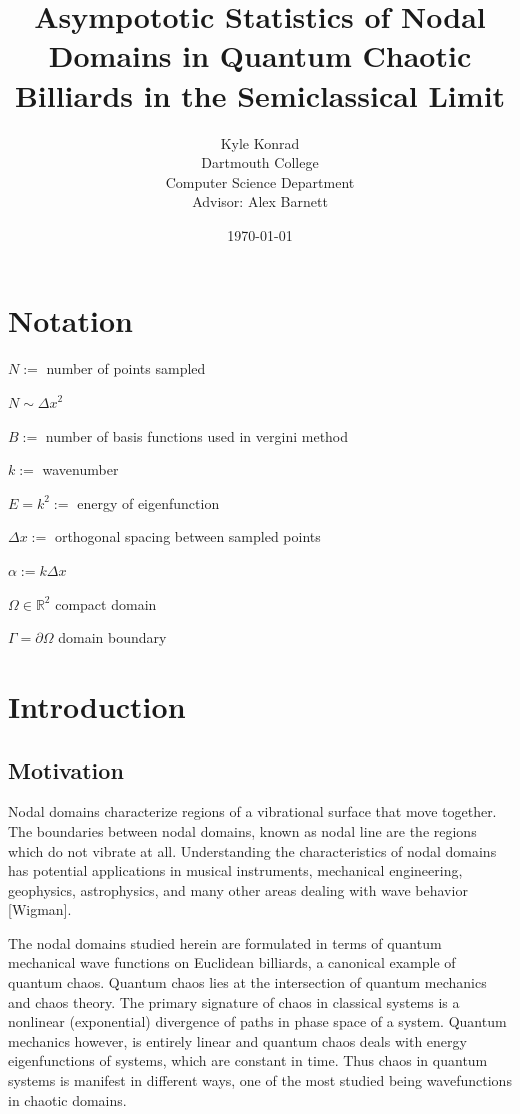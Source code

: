 \documentclass{article}
\begin{document}
\title{Asympototic Statistics of Nodal Domains in Quantum Chaotic Billiards in the Semiclassical Limit}
\author{Kyle Konrad\\
  Dartmouth College\\
  Computer Science Department\\
  Advisor: Alex Barnett}
\date{\today}


\section*{Notation}
$N :=$ number of points sampled

$N \sim {\Delta x}^{2}$

$B :=$ number of basis functions used in vergini method

$k :=$ wavenumber

$E = k^{2} :=$ energy of eigenfunction

$\Delta x :=$ orthogonal spacing between sampled points

$\alpha := k \Delta x$

$\Omega \in \mathbb{R}^2$ compact domain

$\Gamma = \partial \Omega$ domain boundary

\section*{Introduction}
\subsection*{Motivation}
Nodal domains characterize regions of a vibrational surface that move together. The boundaries between nodal domains, known as nodal line are the regions which do not vibrate at all. Understanding the characteristics of nodal domains has potential applications in musical instruments, mechanical engineering, geophysics, astrophysics, and many other areas dealing with wave behavior [Wigman].

The nodal domains studied herein are formulated in terms of quantum mechanical wave functions on Euclidean billiards, a canonical example of quantum chaos. Quantum chaos lies at the intersection of quantum mechanics and chaos theory. The primary signature of chaos in classical systems is a nonlinear (exponential) divergence of paths in phase space of a system. Quantum mechanics however, is entirely linear and quantum chaos deals with energy eigenfunctions of systems, which are constant in time. Thus chaos in quantum systems is manifest in different ways, one of the most studied being wavefunctions in chaotic domains.
\end{document}

